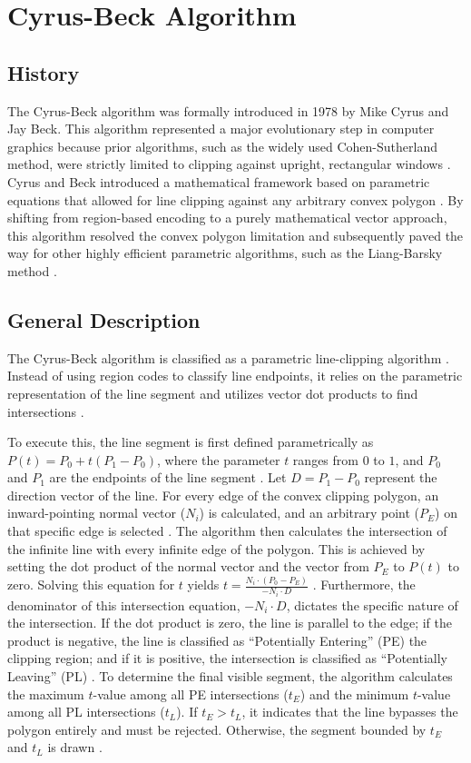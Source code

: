 
\section{Cyrus-Beck Algorithm}

\subsection{History}
The Cyrus-Beck algorithm was formally introduced in 1978 by Mike Cyrus and Jay Beck. This algorithm represented a major evolutionary step in computer graphics because prior algorithms, such as the widely used Cohen-Sutherland method, were strictly limited to clipping against upright, rectangular windows \cite{MatthesDrakopoulos2022}. Cyrus and Beck introduced a mathematical framework based on parametric equations that allowed for line clipping against any arbitrary convex polygon \cite{CyrusBeck1978}. By shifting from region-based encoding to a purely mathematical vector approach, this algorithm resolved the convex polygon limitation and subsequently paved the way for other highly efficient parametric algorithms, such as the Liang-Barsky method \cite{MatthesDrakopoulos2022}.

\subsection{General Description}
The Cyrus-Beck algorithm is classified as a parametric line-clipping algorithm \cite{MatthesDrakopoulos2022}. Instead of using region codes to classify line endpoints, it relies on the parametric representation of the line segment and utilizes vector dot products to find intersections \cite{CyrusBeck1978}. 

To execute this, the line segment is first defined parametrically as $P(t) = P_0 + t(P_1 - P_0)$, where the parameter $t$ ranges from $0$ to $1$, and $P_0$ and $P_1$ are the endpoints of the line segment \cite{CyrusBeck1978}. Let $D = P_1 - P_0$ represent the direction vector of the line. For every edge of the convex clipping polygon, an inward-pointing normal vector ($N_i$) is calculated, and an arbitrary point ($P_E$) on that specific edge is selected \cite{MatthesDrakopoulos2022}.
The algorithm then calculates the intersection of the infinite line with every infinite edge of the polygon. This is achieved by setting the dot product of the normal vector and the vector from $P_E$ to $P(t)$ to zero. Solving this equation for $t$ yields $t = \frac{N_i \cdot (P_0 - P_E)}{-N_i \cdot D}$ \cite{CyrusBeck1978}.
Furthermore, the denominator of this intersection equation, $-N_i \cdot D$, dictates the specific nature of the intersection. If the dot product is zero, the line is parallel to the edge; if the product is negative, the line is classified as ``Potentially Entering'' (PE) the clipping region; and if it is positive, the intersection is classified as ``Potentially Leaving'' (PL) \cite{CyrusBeck1978}.
To determine the final visible segment, the algorithm calculates the maximum $t$-value among all PE intersections ($t_E$) and the minimum $t$-value among all PL intersections ($t_L$).
If $t_E > t_L$, it indicates that the line bypasses the polygon entirely and must be rejected. Otherwise, the segment bounded by $t_E$ and $t_L$ is drawn \cite{ MatthesDrakopoulos2022}.